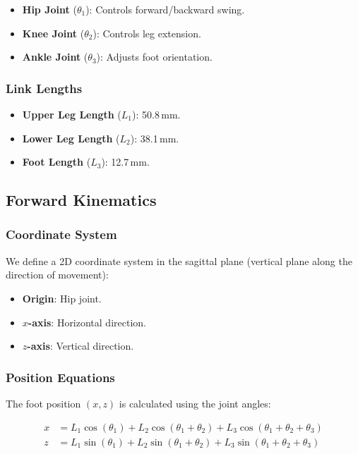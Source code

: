 \documentclass{article}
\begin{document}
\begin{itemize}
    \item \textbf{Hip Joint} ($\theta_1$): Controls forward/backward swing.
    \item \textbf{Knee Joint} ($\theta_2$): Controls leg extension.
    \item \textbf{Ankle Joint} ($\theta_3$): Adjusts foot orientation.
\end{itemize}

\subsubsection{Link Lengths}

\begin{itemize}
    \item \textbf{Upper Leg Length} ($L_1$): 50.8\,mm.
    \item \textbf{Lower Leg Length} ($L_2$): 38.1\,mm.
    \item \textbf{Foot Length} ($L_3$): 12.7\,mm.
\end{itemize}

\subsection{Forward Kinematics}

\subsubsection{Coordinate System}

We define a 2D coordinate system in the sagittal plane (vertical plane along the direction of movement):

\begin{itemize}
    \item \textbf{Origin}: Hip joint.
    \item \textbf{$x$-axis}: Horizontal direction.
    \item \textbf{$z$-axis}: Vertical direction.
\end{itemize}

\subsubsection{Position Equations}

The foot position $(x, z)$ is calculated using the joint angles:

\begin{equation}
\begin{aligned}
x &= L_1 \cos(\theta_1) + L_2 \cos(\theta_1 + \theta_2) + L_3 \cos(\theta_1 + \theta_2 + \theta_3) \\
z &= L_1 \sin(\theta_1) + L_2 \sin(\theta_1 + \theta_2) + L_3 \sin(\theta_1 + \theta_2 + \theta_3)
\end{aligned}
\end{equation}
\end{document}
